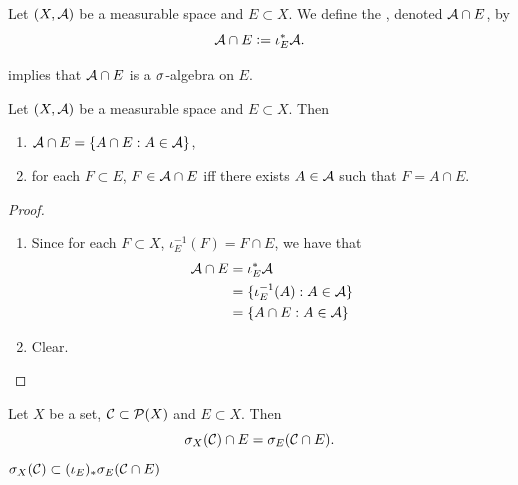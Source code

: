 \documentclass{book}
\begin{document}
	\begin{defn}  
		Let $(X, \mathcal{A})$ be a measurable space and $E \subset X$. We define the , denoted $\mathcal{A} \cap E$, by 
		$$\mathcal{A} \cap E \vcentcolon= \iota_E^* \mathcal{A}.$$
	\end{defn}

	\begin{note}
		 implies that $\mathcal{A} \cap E$ is a $\sigma$-algebra on $E$. 
	\end{note}
	
	\begin{ex} 
		Let $(X, \mathcal{A})$ be a measurable space and $E \subset X$. Then 
		\begin{enumerate}
			\item $\mathcal{A} \cap E = \{A \cap E: A \in \mathcal{A} \}$,
			\item for each $F \subset E$, $F \in \mathcal{A} \cap E$ iff there exists $A \in \mathcal{A}$ such that $F = A \cap E$. 
		\end{enumerate}
	\end{ex}
	
	\begin{proof}\
		\begin{enumerate}
			\item Since for each $F \subset X$, $\iota_E^{-1}(F) = F \cap E$, we have that 
			\begin{align*}
				\mathcal{A} \cap E
				& = \iota_E^* \mathcal{A} \\
				& = \{\iota_E^{-1}(A): A \in \mathcal{A} \} \\
				& = \{ A \cap E: A \in \mathcal{A} \} \\
			\end{align*}
			\item Clear.
		\end{enumerate}
	\end{proof}

	

	\begin{ex}  
		Let $X$ be a set, $\mathcal{C} \subset \mathcal{P}(X)$ and $E \subset X$. Then 
		$$\sigma_X(\mathcal{C}) \cap E = \sigma_E(\mathcal{C} \cap E).$$ 
		 $\sigma_X(\mathcal{C}) \subset (\iota_E)_* \sigma_E(\mathcal{C} \cap E)$
	\end{ex}
	
\end{document}
